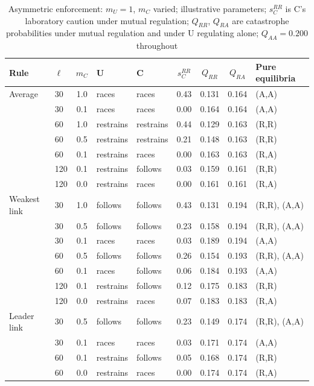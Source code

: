 \documentclass[11pt]{article}
\theoremstyle{plain}
\theoremstyle{definition}
\theoremstyle{remark}
\begin{document}
\begin{table}[htbp]
\centering\small
\caption{Asymmetric enforcement: $m_U=1$, $m_C$ varied; illustrative parameters; $s_C^{RR}$ is C's laboratory caution under mutual regulation; $Q_{RR}$, $Q_{RA}$ are catastrophe probabilities under mutual regulation and under U regulating alone; $Q_{AA}=0.200$ throughout}
\label{tab:asym}
\begin{tabular}{@{}llcllcccl@{}}
\toprule
Rule & $\ell$ & $m_C$ & U & C & $s_C^{RR}$ & $Q_{RR}$ & $Q_{RA}$ & Pure equilibria \\
\midrule
Average & 30 & 1.0 & races & races & 0.43 & 0.131 & 0.164 & (A,A) \\
 & 30 & 0.1 & races & races & 0.00 & 0.164 & 0.164 & (A,A) \\
 & 60 & 1.0 & restrains & restrains & 0.44 & 0.129 & 0.163 & (R,R) \\
 & 60 & 0.5 & restrains & restrains & 0.21 & 0.148 & 0.163 & (R,R) \\
 & 60 & 0.1 & restrains & races & 0.00 & 0.163 & 0.163 & (R,A) \\
 & 120 & 0.1 & restrains & follows & 0.03 & 0.159 & 0.161 & (R,R) \\
 & 120 & 0.0 & restrains & races & 0.00 & 0.161 & 0.161 & (R,A) \\
\midrule
Weakest link & 30 & 1.0 & follows & follows & 0.43 & 0.131 & 0.194 & (R,R), (A,A) \\
 & 30 & 0.5 & follows & follows & 0.23 & 0.158 & 0.194 & (R,R), (A,A) \\
 & 30 & 0.1 & races & races & 0.03 & 0.189 & 0.194 & (A,A) \\
 & 60 & 0.5 & follows & follows & 0.26 & 0.154 & 0.193 & (R,R), (A,A) \\
 & 60 & 0.1 & races & follows & 0.06 & 0.184 & 0.193 & (A,A) \\
 & 120 & 0.1 & restrains & follows & 0.12 & 0.175 & 0.183 & (R,R) \\
 & 120 & 0.0 & restrains & races & 0.07 & 0.183 & 0.183 & (R,A) \\
\midrule
Leader link & 30 & 0.5 & follows & follows & 0.23 & 0.149 & 0.174 & (R,R), (A,A) \\
 & 30 & 0.1 & races & races & 0.03 & 0.171 & 0.174 & (A,A) \\
 & 60 & 0.1 & restrains & follows & 0.05 & 0.168 & 0.174 & (R,R) \\
 & 60 & 0.0 & restrains & races & 0.00 & 0.174 & 0.174 & (R,A) \\
\bottomrule
\end{tabular}
\end{table}
\end{document}
